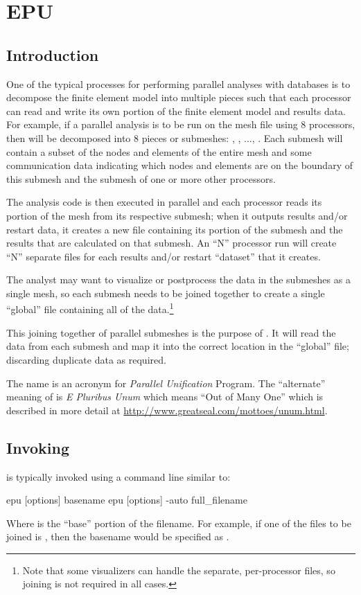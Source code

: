 \chapter{EPU}\label{ch:epu}
\section{Introduction}
One of the typical processes for performing parallel analyses with
\exo{} databases is to decompose the finite element model into
multiple pieces such that each processor can read and write its own
portion of the finite element model and results data.  For example, if
a parallel analysis is to be run on the mesh file  using
8 processors, then  will be decomposed into 8 pieces or submeshes:
, , $\ldots$,
. Each submesh will contain a subset of the nodes and
elements of the entire mesh and some communication data indicating
which nodes and elements are on the boundary of this submesh and the
submesh of one or more other processors. 

The analysis code is then executed in parallel and each processor
reads its portion of the mesh from its respective submesh; when it
outputs results and/or restart data, it creates a new file containing
its portion of the submesh and the results that are calculated on that
submesh.  An ``N'' processor run will create ``N'' separate files for
each results and/or restart ``dataset'' that it creates.

The analyst may want to visualize or postprocess the data in the
submeshes as a single mesh, so each submesh needs to be joined
together to create a single ``global'' file containing all of the
data.\footnote{Note that some visualizers can handle the separate,
per-processor files, so joining is not required in all cases.}

This joining together of parallel submeshes is the purpose of \epu{}.
It will read the data from each submesh and map it into the correct
location in the ``global'' file; discarding duplicate data as
required.

The name \epu{} is an acronym for {\em \exo{} Parallel Unification}
Program.  The ``alternate'' meaning of \epu{} is {\em E Pluribus Unum} which means
``Out of Many One'' which is described in more detail at
\url{http://www.greatseal.com/mottoes/unum.html}. 

\section{Invoking \epu}
\epu{} is typically invoked using a command line similar to:
\begin{syntax}
epu [options] basename
epu [options] -auto full_filename
\end{syntax}
Where  is the ``base'' portion of the filename.  For
example, if one of the files to be joined is ,
then the basename would be specified as .  

